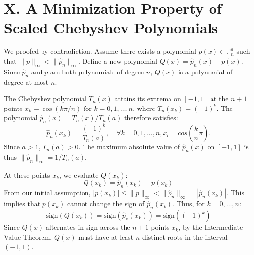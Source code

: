 \documentclass[a4paper]{article}
\begin{document}
\section*{X. A Minimization Property of Scaled Chebyshev Polynomials}

We proofed by contradiction. Assume there exists a polynomial $p(x) \in \mathbb{P}_n^a$ such that $\|p\|_{\infty} < \|\hat{p}_n\|_{\infty}$.
Define a new polynomial $Q(x) = \hat{p}_n(x) - p(x)$. Since $\hat{p}_n$ and $p$ are both polynomials of degree $n$, $Q(x)$ is a polynomial of degree at most $n$.

The Chebyshev polynomial $T_n(x)$ attains its extrema on $[-1,1]$ at the $n+1$ points $x_k = \cos(k\pi/n)$ for $k=0,1,\dots,n$, where $T_n(x_k) = (-1)^k$.
The polynomial $\hat{p}_n(x) = T_n(x)/T_n(a)$ therefore satisfies:
\[
\hat{p}_n(x_k) = \frac{(-1)^k}{T_n(a)},\quad \forall k=0,1,...,n,x_l=cos(\frac{k}{n}\pi).
\]
Since $a > 1$, $T_n(a) > 0$. The maximum absolute value of $\hat{p}_n(x)$ on $[-1,1]$ is thus $\|\hat{p}_n\|_{\infty} = 1/T_n(a)$.


At these points $x_k$, we evaluate $Q(x_k)$:
\[
Q(x_k) = \hat{p}_n(x_k) - p(x_k)
\]
From our initial assumption, $|p(x_k)| \le \|p\|_{\infty} < \|\hat{p}_n\|_{\infty} = |\hat{p}_n(x_k)|$.
This implies that $p(x_k)$ cannot change the sign of $\hat{p}_n(x_k)$. Thus, for $k=0, \dots, n$:
\[
\mathrm{sign}(Q(x_k)) = \mathrm{sign}(\hat{p}_n(x_k)) = \mathrm{sign}((-1)^k)
\]
Since $Q(x)$ alternates in sign across the $n+1$ points $x_k$, by the Intermediate Value Theorem, $Q(x)$ must have at least $n$ distinct roots in the interval $(-1,1)$.
\end{document}
